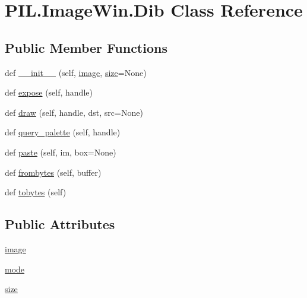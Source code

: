 \hypertarget{classPIL_1_1ImageWin_1_1Dib}{}\section{P\+I\+L.\+Image\+Win.\+Dib Class Reference}
\label{classPIL_1_1ImageWin_1_1Dib}
\subsection*{Public Member Functions}
\begin{DoxyCompactItemize}
\item 
def \hyperlink{classPIL_1_1ImageWin_1_1Dib_af15ffb902fd5d195bf4cd089203eb4cd}{\+\_\+\+\_\+init\+\_\+\+\_\+} (self, \hyperlink{classPIL_1_1ImageWin_1_1Dib_aa58ccb286852e15a57a356cb0589c163}{image}, \hyperlink{classPIL_1_1ImageWin_1_1Dib_ae6273cf68a43e12f710dd26d7a2b9837}{size}=None)
\item 
def \hyperlink{classPIL_1_1ImageWin_1_1Dib_ab887b4c46b393604b27169ce9e716e2c}{expose} (self, handle)
\item 
def \hyperlink{classPIL_1_1ImageWin_1_1Dib_a0f54b8802660ce056e50383d1a639dd7}{draw} (self, handle, dst, src=None)
\item 
def \hyperlink{classPIL_1_1ImageWin_1_1Dib_a77483e00d82492dae10e37eb2fed913b}{query\+\_\+palette} (self, handle)
\item 
def \hyperlink{classPIL_1_1ImageWin_1_1Dib_a77c4aa03c50825a6adf71b14be19fe20}{paste} (self, im, box=None)
\item 
def \hyperlink{classPIL_1_1ImageWin_1_1Dib_a7770f97d7b54875639b81f08c61870fc}{frombytes} (self, buffer)
\item 
def \hyperlink{classPIL_1_1ImageWin_1_1Dib_a43c2e8a72116498d86954b187bb0d7eb}{tobytes} (self)
\end{DoxyCompactItemize}
\subsection*{Public Attributes}
\begin{DoxyCompactItemize}
\item 
\hyperlink{classPIL_1_1ImageWin_1_1Dib_aa58ccb286852e15a57a356cb0589c163}{image}
\item 
\hyperlink{classPIL_1_1ImageWin_1_1Dib_ab1ae9942bb716440c85aa52d62f7b03a}{mode}
\item 
\hyperlink{classPIL_1_1ImageWin_1_1Dib_ae6273cf68a43e12f710dd26d7a2b9837}{size}
\end{DoxyCompactItemize}


